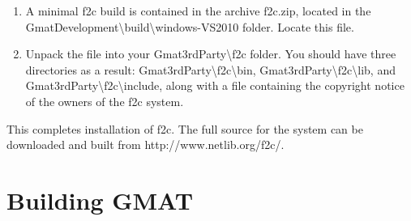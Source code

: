 \documentclass[letterpaper,10pt]{article}%
\begin{document}
\begin{enumerate}
\item A minimal f2c build is contained in the archive f2c.zip, located in the GmatDevelopment\textbackslash build\textbackslash windows-VS2010 folder.  Locate this file.
\item Unpack the file into your Gmat3rdParty\textbackslash f2c folder.  You should have three directories as a result: Gmat3rdParty\textbackslash f2c\textbackslash bin, Gmat3rdParty\textbackslash f2c\textbackslash lib, and Gmat3rdParty\textbackslash f2c\textbackslash include, along with a file containing the copyright notice of the owners of the f2c system.
\end{enumerate}

This completes installation of f2c.  The full source for the system can be downloaded and built from http://www.netlib.org/f2c/.

\section{Building GMAT}
\end{document}
